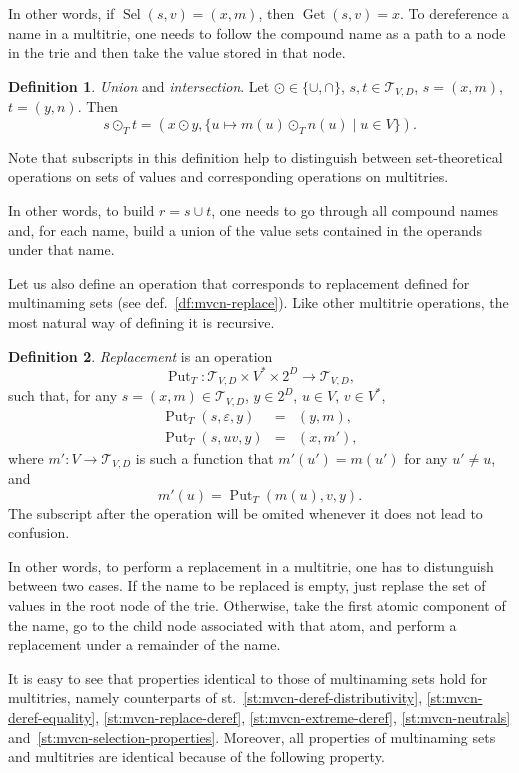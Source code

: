 \documentclass{article}
\theoremstyle{definition}
\newtheorem{Df}{Definition}
\newcommand{\setcharmt}{T}
\newcommand{\setsymbol}[3]{\mathcal{#1}_{#2,#3}}
\newcommand{\setmt}[2]{\setsymbol{\setcharmt}{#1}{#2}}
\newcommand{\select}{\operatorname{Sel}}
\newcommand{\deref}{\operatorname{Get}}
\newcommand{\putval}{\operatorname{Put}}
\begin{document}
In other words, if $\select(s,v) = (x,m)$, then $\deref(s, v) = x$. To
dereference a name in a multitrie, one needs to follow the compound name
as a path to a node in the trie and then take the value stored in that node.

\begin{Df}\label{df:mt-setop}
\emph{Union} and \emph{intersection}.
Let
$\odot \in \{ \cup, \cap \}$,
$s, t \in \setmt{V}{D}$,
$s = (x, m)$, $t = (y, n)$.
Then
\[
  s \odot_\setcharmt  t =
    (x \odot y, \{ u \mapsto m(u) \odot_\setcharmt n(u) \mid u \in V \}) .
\]
\end{Df}
Note that subscripts in this definition help to distinguish between
set-the\-o\-re\-ti\-cal operations on sets of values and corresponding operations
on multitries.

In other words, to build $r = s \cup t$, one needs to go through all compound
names and, for each name, build a union of the value sets contained in the
operands under that name.

Let us also define an operation that corresponds to replacement
defined for multinaming sets (see def.~\ref{df:mvcn-replace}). Like other multitrie
operations, the most natural way of defining it is recursive.

\begin{Df}\label{df:mt-replace}
\emph{Replacement} is an operation
\[
  \putval_\setcharmt : \setmt{V}{D} \times V^\ast \times 2^D \to \setmt{V}{D},
\]
such that, for any
$s = (x, m) \in \setmt{V}{D}$, $y \in 2^D$, $u \in V$, $v \in V^\ast$,
\begin{eqnarray*}
  \putval_\setcharmt(s, \varepsilon, y) & = & (y, m) , \\
  \putval_\setcharmt(s, u v, y) & = & (x, m') ,
\end{eqnarray*}
where $m' : V \to \setmt{V}{D}$ is such a function that $m'(u') = m(u')$ for any
$u'\neq u$, and
\[
  m'(u) = \putval_\setcharmt(m(u), v, y) .
\]
The subscript after the operation will be omited whenever it does not lead to
confusion.
\end{Df}

In other words, to perform a replacement in a multitrie, one has to distunguish
between two cases. If the name to be replaced is empty, just replase the set of
values in the root node of the trie. Otherwise, take the first atomic component
of the name, go to the child node associated with that atom, and perform a
replacement under a remainder of the name.

It is easy to see that properties identical to those of multinaming sets
hold for multitries, namely counterparts of
st.~\ref{st:mvcn-deref-distributivity},
\ref{st:mvcn-deref-equality},
\ref{st:mvcn-replace-deref},
\ref{st:mvcn-extreme-deref},
\ref{st:mvcn-neutrals}
and~\ref{st:mvcn-selection-properties}.
Moreover, all properties of multinaming sets and multitries are identical because
of the following property.
\end{document}
